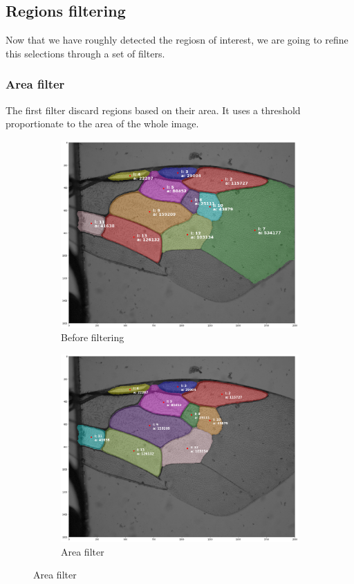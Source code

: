 \documentclass[a4paper]{article}
\begin{document}
\newpage
\subsection{Regions filtering}

Now that we have roughly detected the regiosn of interest, we are going to refine this selections through a set of filters.

\subsubsection{Area filter}

The first filter discard regions based on their area. It uses a threshold proportionate to the area of the whole image.

\begin{figure}[H]
\begin{subfigure}{.5\textwidth}
    \centering
    \includegraphics[width=\linewidth]{figures/first_rs.png}
    \caption{Before filtering}
\end{subfigure}
\begin{subfigure}{.5\textwidth}
    \centering
    \includegraphics[width=\linewidth]{figures/filter_area.png}
    \caption{Area filter}
\end{subfigure}
\caption{Area filter}
\end{figure}
\end{document}
